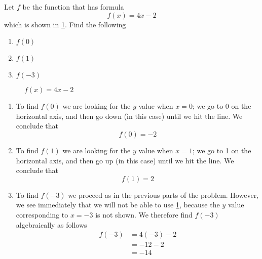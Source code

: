 \begin{myexample}
Let $f$ be the function that has formula
\[
	f(x) = 4x-2
\]
which is shown in \cref{fig:linfunctioneval}. Find the following
\begin{multicols}{3}
	\begin{enumerate}
		\item $f(0)$
		\item $f(1)$
		\item $f(-3)$
	\end{enumerate} 
\end{multicols}
{}
\end{myexample}
\begin{figure}[!h]
	\centering
	\caption{$f(x)=4x-2$}
	\label{fig:linfunctioneval}
\end{figure}
\begin{myProof}
	\begin{enumerate}
		\item To find $f(0)$ we are looking for the $y$ value when $x=0$; we go to 0 on the 
		horizontal axis, and then go down (in this case) until we hit the line. We conclude that
		\[
			f(0)=-2
		\]
		\item To find $f(1)$ we are looking for the $y$ value when $x=1$; we go to 1 on the 
		horizontal axis, and then go up (in this case) until we hit the line. We conclude that
		\[
			f(1) = 2
		\]  
		\item To find $f(-3)$ we proceed as in the previous parts of the problem. However, we see immediately
		that we will not be able to use \cref{fig:linfunctioneval}, because the $y$ value corresponding
		to $x=-3$ is not shown. We therefore find $f(-3)$ algebraically as follows
		\begin{align*}
			f(-3) & =  4(-3)-2 \\
			      & =  -12-2   \\
			      & =  -14     
		\end{align*} 
	\end{enumerate} 
	{}
\end{myProof} 
\FloatBarrier

